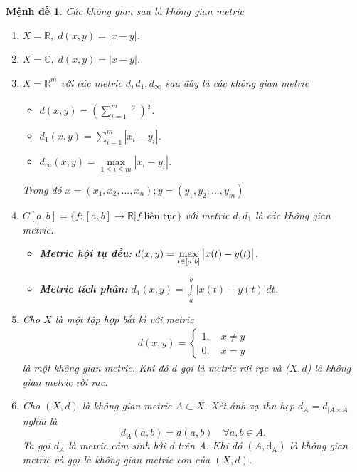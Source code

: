 \documentclass[a4paper, 12pt]{article}
\newtheorem{proposition}[theorem]{Mệnh đề}
\begin{document}
\begin{proposition}
Các không gian sau là không gian metric
\begin{enumerate}
    \item $X=\mathbb{R}, \; d(x,y)=|x-y|$.
    \item $X=\mathbb{C}, \; d(x,y) = |x-y|$.
    \item $ X=\mathbb{R}^m$ với các metric $d,{d_1},{d_\infty}$ sau đây là các không gian metric
    \begin{itemize}
        \item $d(x,y) = {\left( {\sum\limits_{i = 1}^m {\mathop {\left| {{x_i} - {y_i}} \right|}\nolimits^2 } } \right)^{\frac{1}{2}}}$.
        \item $d_1(x,y) =\sum\limits_{i = 1}^m {\left| {{x_i} - {y_i}} \right|}$.
        \item $d_\infty(x,y) = \mathop {\max }\limits_{1 \le i \le m} | {x_i} - {y_i}|$.
     \end{itemize}
  Trong đó $x=(x_1,x_2,...,x_n) ; y=(y_1,y_2,...,y_m)$
  \item $C[a,b] = \{f:[a,b] \to \mathbb{R}|f\; \text{liên tục}\}$ với metric $d, d_1$ là các không gian metric.
  \begin{itemize}
      \item \textbf{Metric hội tụ đều:} $d(x,y)=\mathop {\max }\limits_{t \in {\rm{[}}a,b{\rm{]}}} \left| {x(t) - y(t)} \right|$.
      \item \textbf{Metric tích phân:} $d_1(x,y)=\displaystyle\int\limits_a^b|{x(t)-y(t)}|dt$.
  \end{itemize}
  \item Cho $X$ là một tập hợp bất kì với metric
  \begin{align*}
  d(x,y)=
      \begin{cases}
        1, \quad x\neq y\\
        0, \quad x=y
      \end{cases}
  \end{align*}
là một không gian metric. Khi đó $d$ gọi là metric rời rạc và ($X,d$) là không gian metric rời rạc.
  \item Cho $(X,d)$ là không gian metric $A\subset X$. Xét ánh xạ thu hẹp $d_A=d_{|A\times A}$ nghĩa là 
  $$d_A(a,b)=d(a,b)\quad \forall a,b \in A.$$
  Ta gọi $d_A$ là metric cảm sinh bởi d trên A. Khi đó $(A,\mathrm{d_A})$ là không gian metric và gọi là không gian metric con của $(X,d)$.
\end{enumerate}
\end{proposition}
\end{document}
